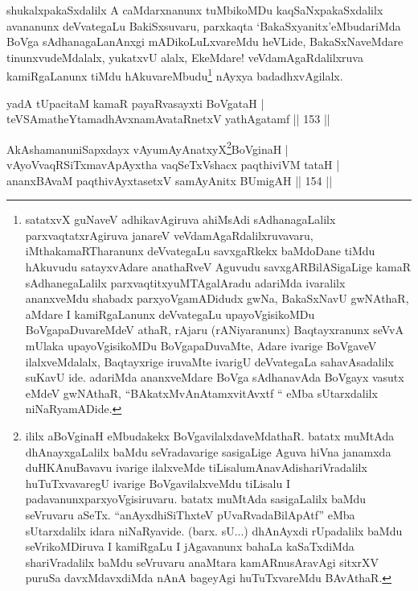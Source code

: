 \begin{artha}
shukalxpakaSxdalilx A caMdarxnanunx tuMbikoMDu kaqSaNxpakaSxdalilx avananunx deVvategaLu BakiSxsuvaru, parxkaqta `BakaSxyanitx'eMbudariMda BoVga sAdhanagaLanAnxgi mADikoLuLxvareMdu heVLide, BakaSxNaveMdare tinunxvudeMdalalx, yukatxvU alalx, EkeMdare! veVdamAgaRdalilxruva kamiRgaLanunx tiMdu hAkuvareMbudu\footnote{satatxvX guNaveV adhikavAgiruva ahiMsAdi sAdhanagaLalilx parxvaqtatxrAgiruva  janareV veVdamAgaRdalilxruvavaru, iMthakamaRTharanunx deVvategaLu  savxgaRkekx baMdoDane tiMdu hAkuvudu satayxvAdare anathaRveV Aguvudu  savxgARBilASigaLige kamaR sAdhanegaLalilx parxvaqtitxyuMTAgalAradu  adariMda ivaralilx ananxveMdu shabadx parxyoVgamADidudx gwNa,  BakaSxNavU gwNAthaR, aMdare I kamiRgaLanunx deVvategaLu  upayoVgisikoMDu BoVgapaDuvareMdeV athaR, rAjaru (rANiyaranunx)  Baqtayxranunx seVvA mUlaka upayoVgisikoMDu BoVgapaDuvaMte, Adare  ivarige BoVgaveV ilalxveMdalalx, Baqtayxrige iruvaMte ivarigU  deVvategaLa sahavAsadalilx suKavU ide. adariMda ananxveMdare BoVga  sAdhanavAda BoVgayx vasutx eMdeV gwNAthaR, ``BAkatxMvA\s  nAtamxvitAvxtf `` eMba sUtarxdalilx niNaRyamADide.} nAyxya badadhxvAgilalx.
\end{artha}


\begin{shl}
yadA tUpacitaM kamaR payaRvasayxti BoVgataH | \\
teVSAmatheYtamadhAvxnamAvataRnetxV yathAgatamf \hfill|| 153 || 
\end{shl}


\begin{shl}
AkAshamanuniSapxdayx vAyumAyAnatxyX\footnote{ililx aBoVginaH eMbudakekx BoVgavilalxdaveMdathaR. batatx  muMtAda dhAnayxgaLalilx baMdu seVradavarige sasigaLige Aguva hiVna  janamxda duHKAnuBavavu ivarige ilalxveMde tiLisalu\break mAnavAdishariVradalilx huTuTxvavaregU ivarige BoVgavilalxveMdu  tiLisalu I padavanunx\break parxyoVgisiruvaru. batatx muMtAda sasigaLalilx  baMdu seVruvaru aSeTx. ``anAyxdhiSiThxteV pUvaRvadaBilApAtf'' eMba  sUtarxdalilx idara niNaRyavide. (barx. sU...) dhAnAyxdi rUpadalilx  baMdu seVrikoMDiruva I kamiRgaLu I jAgavanunx bahaLa kaSaTxdiMda  shariVradalilx baMdu seVruvaru anaMtara kamARnusAravAgi sitxrXV  puruSa davxMdavxdiMda nAnA bageyAgi huTuTxvareMdu BAvAthaR.}BoVginaH | \\
vAyoVvaqRSiTxmavApAyxtha vaqSeTxVshacx paqthiviVM tataH | \\
ananxBAvaM paqthivAyx\s tasetxV samAyAnitx BUmigAH \hfill|| 154 || 
\end{shl}

